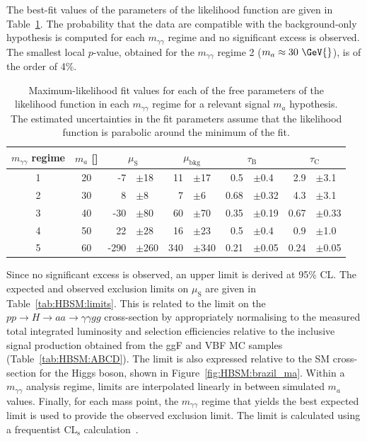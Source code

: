 The best-fit values of the parameters of the likelihood function are given in Table~\ref{tab:HBSM:MLE}.
The probability that the data are compatible with the background-only hypothesis is computed for each $m_{\gamma\gamma}$ regime and no significant 
excess is observed. The smallest local $p$-value, obtained for the $m_{\gamma\gamma}$ regime 2 ($m_a\approx30~\GeV{}$), is of the order of 4\%.
\begin{table}[t]
  \begin{center}
    \caption{Maximum-likelihood fit values for each of the free parameters of the likelihood function 
      in each $m_{\gamma\gamma}$ regime for a relevant signal $m_a$ hypothesis.
      The estimated uncertainties in the fit parameters assume
      that the likelihood function is parabolic around the minimum of the fit.
    }
    \label{tab:HBSM:MLE}
          {\footnotesize
	    \begin{tabular}{
                cc
                r@{}lr@{}l
                r@{}lr@{}l
              }
	      \hline
              $m_{\gamma\gamma}$ regime & $m_a$ [\GeV{}] &   \multicolumn{2}{c}{$\mu_\text{S}$} &   \multicolumn{2}{c}{$\mu_\text{bkg}$}  &   \multicolumn{2}{c}{$\tau_\text{B}$} & \multicolumn{2}{c}{$\tau_\text{C}$} \\
	      \hline
              1 & 20 &  -7&$\pm$18    & 11&$\pm$17   & 0.5 &$\pm$0.4 &  2.9&$\pm$3.1   \\
              2 & 30 &  8&$\pm$8      & 7&$\pm$6     & 0.68 &$\pm$0.32 & 4.3&$\pm$3.1   \\
              3 & 40 &  -30&$\pm$80   & 60&$\pm$70   & 0.35 &$\pm$0.19 & 0.67&$\pm$0.33 \\
              4 & 50 &  22&$\pm$28    & 16&$\pm$23   & 0.5 &$\pm$0.4 & 0.9&$\pm$1.0   \\
              5 & 60 &  -290&$\pm$260 & 340&$\pm$340 & 0.21&$\pm$0.05 & 0.24&$\pm$0.05 \\
	      \hline
	    \end{tabular}
          }
  \end{center}
\end{table}
Since no significant excess is observed, an upper limit is derived at 95\% CL.            
The expected and observed exclusion limits on $\mu_\text{S}$ are given in Table~\ref{tab:HBSM:limits}.
This is related to the limit on the $pp\to H\to aa \to \gamma\gamma gg$ cross-section by appropriately normalising to the measured total integrated luminosity 
and selection efficiencies relative to the inclusive signal production obtained from the ggF and VBF MC samples (Table~\ref{tab:HBSM:ABCD}).
The limit is also expressed relative to the SM cross-section for the Higgs boson, shown in Figure~\ref{fig:HBSM:brazil_ma}.
Within a $m_{\gamma\gamma}$ analysis regime, limits are interpolated linearly in between simulated $m_a$ values.
Finally, for each mass point, the $m_{\gamma\gamma}$ regime that yields the best expected limit is used to provide the observed exclusion limit.
The limit is calculated using a frequentist $\text{CL}_\text{s}$ calculation~\cite{Read:2002hq}. 


